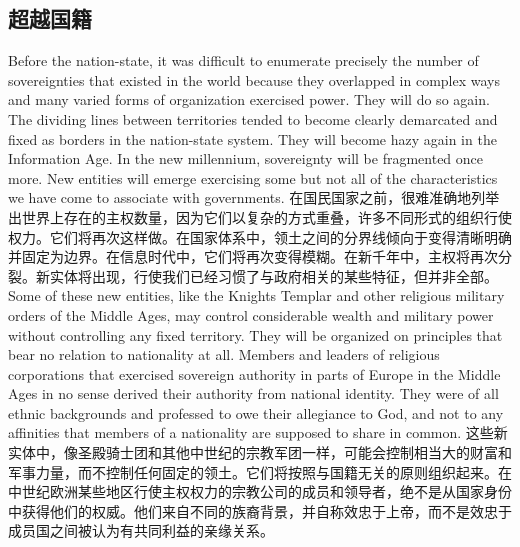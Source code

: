 \subsection{超越国籍}
\begin{paracol}{2}
	Before the nation-state, it was difficult to enumerate precisely the number of sovereignties that existed in the world because they overlapped in complex ways and many varied forms of organization exercised power. They will do so again. The dividing lines between territories tended to become clearly demarcated and fixed as borders in the nation-state system. They will become hazy again in the Information Age. In the new millennium, sovereignty will be fragmented once more. New entities will emerge exercising some but not all of the characteristics we have come to associate with governments.
	\switchcolumn
	在国民国家之前，很难准确地列举出世界上存在的主权数量，因为它们以复杂的方式重叠，许多不同形式的组织行使权力。它们将再次这样做。在国家体系中，领土之间的分界线倾向于变得清晰明确并固定为边界。在信息时代中，它们将再次变得模糊。在新千年中，主权将再次分裂。新实体将出现，行使我们已经习惯了与政府相关的某些特征，但并非全部。
	\switchcolumn*
	Some of these new entities, like the Knights Templar and other religious military orders of the Middle Ages, may control considerable wealth and military power without controlling any fixed territory. They will be organized on principles that bear no relation to nationality at all. Members and leaders of religious corporations that exercised sovereign authority in parts of Europe in the Middle Ages in no sense derived their authority from national identity. They were of all ethnic backgrounds and professed to owe their allegiance to God, and not to any affinities that members of a nationality are supposed to share in common.
	\switchcolumn
	这些新实体中，像圣殿骑士团和其他中世纪的宗教军团一样，可能会控制相当大的财富和军事力量，而不控制任何固定的领土。它们将按照与国籍无关的原则组织起来。在中世纪欧洲某些地区行使主权权力的宗教公司的成员和领导者，绝不是从国家身份中获得他们的权威。他们来自不同的族裔背景，并自称效忠于上帝，而不是效忠于成员国之间被认为有共同利益的亲缘关系。
\end{paracol}

